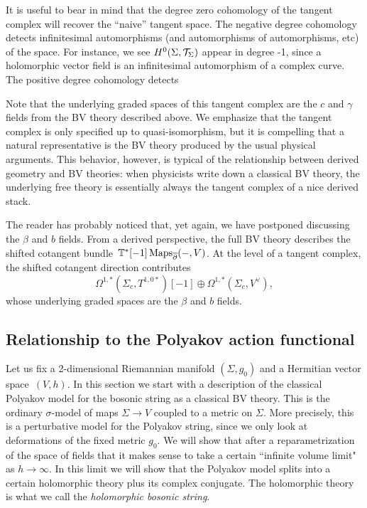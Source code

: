\begin{rmk}
It is useful to bear in mind that the degree zero cohomology of the tangent complex will recover the ``naive'' tangent space.
The negative degree cohomology detects infinitesimal automorphisms (and automorphisms of automorphisms, etc) of the space.
For instance, we see $H^0(\Sigma,\mathcal T_\Sigma)$ appear in degree -1, 
since a holomorphic vector field is an infinitesimal automorphism of a complex curve.
The positive degree cohomology detects 
\end{rmk}

Note that the underlying graded spaces of this tangent complex are the $c$ and $\gamma$ fields from the BV theory described above.
We emphasize that the tangent complex is only specified up to quasi-isomorphism,
but it is compelling that a natural representative is the BV theory produced by the usual physical arguments.
This behavior, however, is typical of the relationship between derived geometry and BV theories:
when physicists write down a classical BV theory, 
the underlying free theory is essentially always the tangent complex of a nice derived stack.

The reader has probably noticed that, yet again, we have postponed discussing the $\beta$ and $b$ fields.
From a derived perspective, the full BV theory describes the shifted cotangent bundle~$\mathbb T^*[-1]\operatorname{Maps}_{\overline{\partial}}(-,V)$.
At the level of a tangent complex, the shifted cotangent direction contributes
\[
\Omega^{1,*}(\Sigma_c,T^{1,0*})[-1] \oplus \Omega^{1,*}(\Sigma_c,V^\vee),
\]
whose underlying graded spaces are the $\beta$ and $b$ fields.

\subsection{Relationship to the Polyakov action functional}

Let us fix a 2-dimensional Riemannian manifold $(\Sigma, g_0)$ and a Hermitian vector space~$(V,h)$. 
In this section we start with a description of the classical Polyakov model for the bosonic string as a classical BV theory. 
This is the ordinary $\sigma$-model of maps $\Sigma \to V$ coupled to a metric on $\Sigma$. 
More precisely, this is a perturbative model for the Polyakov string, since we only look at deformations of the fixed metric $g_0$. We will show that after a reparametrization of the space of fields that it makes sense to take a certain ``infinite volume limit" as $h \to \infty$. In this limit we will show that the Polyakov model splits into a certain holomorphic theory plus its complex conjugate. The holomorphic theory is what we call the {\em holomorphic bosonic string}.


